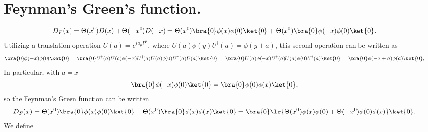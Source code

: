 %
%
\section{Feynman's Green's function.}

\begin{dmath}\label{eqn:qftLecture13:280}
D_F(x)
=
\Theta(x^0) D(x) +
\Theta(-x^0) D(-x)
=
\Theta(x^0) \bra{0} \phi(x) \phi(0) \ket{0}
+\Theta(x^0) \bra{0} \phi(-x) \phi(0) \ket{0}.
\end{dmath}
Utilizing a translation operation \( U(a) = e^{i a_\mu P^\mu } \), where \( U(a) \phi(y) U^\dagger(a) = \phi(y + a) \), this second operation can be written as
\begin{dmath}\label{eqn:qftLecture13:300}
\bra{0} \phi(-x) \phi(0) \ket{0}
=
\bra{0} U^\dagger(a) U(a) \phi(-x) U^\dagger(a) U(a) \phi(0) U^\dagger(a) U(a) \ket{0}
=
\bra{0} U(a) \phi(-x) U^\dagger(a) U(a) \phi(0) U^\dagger(a) \ket{0}
=
\bra{0} \phi(-x + a) \phi(a) \ket{0},
\end{dmath}
In particular, with \( a = x \)
\begin{dmath}\label{eqn:qftLecture13:320}
\bra{0} \phi(-x) \phi(0) \ket{0}
=
\bra{0} \phi(0) \phi(x) \ket{0},
\end{dmath}
so the Feynman's Green function can be written
\begin{dmath}\label{eqn:qftLecture13:340}
D_F(x) =
\Theta(x^0) \bra{0} \phi(x) \phi(0) \ket{0}
+\Theta(x^0) \bra{0} \phi(x) \phi(x) \ket{0}
=
\bra{0}
\lr{
\Theta(x^0)
\phi(x) \phi(0)
+
\Theta(-x^0)
\phi(0) \phi(x)
}
\ket{0}.
\end{dmath}
We define

